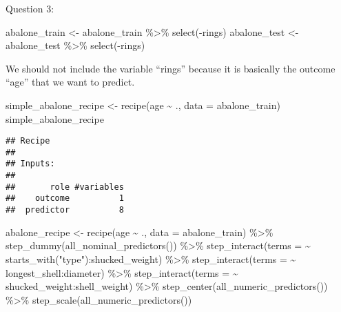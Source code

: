 \documentclass[
]{article}
\newenvironment{Shaded}{\begin{snugshade}}{\end{snugshade}}
\newcommand{\AttributeTok}[1]{\textcolor[rgb]{0.77,0.63,0.00}{#1}}
\newcommand{\FunctionTok}[1]{\textcolor[rgb]{0.00,0.00,0.00}{#1}}
\newcommand{\NormalTok}[1]{#1}
\newcommand{\OtherTok}[1]{\textcolor[rgb]{0.56,0.35,0.01}{#1}}
\newcommand{\SpecialCharTok}[1]{\textcolor[rgb]{0.00,0.00,0.00}{#1}}
\newcommand{\StringTok}[1]{\textcolor[rgb]{0.31,0.60,0.02}{#1}}
\begin{document}
\n

Question 3:

\begin{Shaded}
\begin{Highlighting}[]
\NormalTok{abalone\_train }\OtherTok{\textless{}{-}}\NormalTok{ abalone\_train }\SpecialCharTok{\%\textgreater{}\%} \FunctionTok{select}\NormalTok{(}\SpecialCharTok{{-}}\NormalTok{rings)}
\NormalTok{abalone\_test }\OtherTok{\textless{}{-}}\NormalTok{ abalone\_test }\SpecialCharTok{\%\textgreater{}\%} \FunctionTok{select}\NormalTok{(}\SpecialCharTok{{-}}\NormalTok{rings)}
\end{Highlighting}
\end{Shaded}

\n

We should not include the variable ``rings'' because it is basically the
outcome ``age'' that we want to predict. \n

\begin{Shaded}
\begin{Highlighting}[]
\NormalTok{simple\_abalone\_recipe }\OtherTok{\textless{}{-}} \FunctionTok{recipe}\NormalTok{(age }\SpecialCharTok{\textasciitilde{}}\NormalTok{ ., }\AttributeTok{data =}\NormalTok{ abalone\_train)}
\NormalTok{simple\_abalone\_recipe}
\end{Highlighting}
\end{Shaded}

\begin{verbatim}
## Recipe
## 
## Inputs:
## 
##       role #variables
##    outcome          1
##  predictor          8
\end{verbatim}

\begin{Shaded}
\begin{Highlighting}[]
\NormalTok{abalone\_recipe }\OtherTok{\textless{}{-}} \FunctionTok{recipe}\NormalTok{(age }\SpecialCharTok{\textasciitilde{}}\NormalTok{ ., }\AttributeTok{data =}\NormalTok{ abalone\_train) }\SpecialCharTok{\%\textgreater{}\%}
  \FunctionTok{step\_dummy}\NormalTok{(}\FunctionTok{all\_nominal\_predictors}\NormalTok{()) }\SpecialCharTok{\%\textgreater{}\%}
  \FunctionTok{step\_interact}\NormalTok{(}\AttributeTok{terms =} \SpecialCharTok{\textasciitilde{}} \FunctionTok{starts\_with}\NormalTok{(}\StringTok{"type"}\NormalTok{)}\SpecialCharTok{:}\NormalTok{shucked\_weight) }\SpecialCharTok{\%\textgreater{}\%}
  \FunctionTok{step\_interact}\NormalTok{(}\AttributeTok{terms =} \SpecialCharTok{\textasciitilde{}}\NormalTok{ longest\_shell}\SpecialCharTok{:}\NormalTok{diameter) }\SpecialCharTok{\%\textgreater{}\%}
  \FunctionTok{step\_interact}\NormalTok{(}\AttributeTok{terms =} \SpecialCharTok{\textasciitilde{}}\NormalTok{ shucked\_weight}\SpecialCharTok{:}\NormalTok{shell\_weight) }\SpecialCharTok{\%\textgreater{}\%}
  \FunctionTok{step\_center}\NormalTok{(}\FunctionTok{all\_numeric\_predictors}\NormalTok{()) }\SpecialCharTok{\%\textgreater{}\%}
  \FunctionTok{step\_scale}\NormalTok{(}\FunctionTok{all\_numeric\_predictors}\NormalTok{())}
\end{Highlighting}
\end{Shaded}
\end{document}

